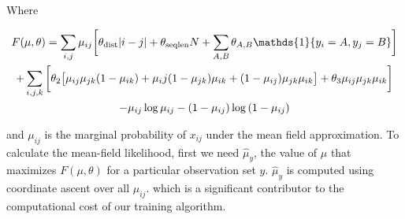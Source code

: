 \documentclass{article}
\begin{document}
Where 

\begin{multline} \label{eq:f}
F(\mu, \theta) = \sum_{i, j}\mu_{ij}\bigg[\theta_{\textmd{dist}}|i - j|+ \theta_{\textmd{seqlen}}N + \sum_{A, B} \theta_{A, B}\mathds{1}\{y_i = A, y_j = B\}\bigg] \\
+ \sum_{i, j, k} \bigg[\theta_2 \big[\mu_{ij}\mu_{jk}(1-\mu_{ik}) + \mu_ij(1-\mu_{jk})\mu_{ik} + (1 - \mu_{ij})\mu_{jk}\mu_{ik} \big] + \theta_3 \mu_{ij}\mu_{jk}\mu_{ik} \bigg] \\
- \mu_{ij} \log{\mu_{ij}} - (1 - \mu_{ij})\log{(1 - \mu_{ij})}
\end{multline}

and $\mu_{ij}$ is the marginal probability of $x_{ij}$ under the mean field approximation. To calculate the mean-field likelihood, first we need $\hat{\mu}_{y}$, the value of $\mu$ that maximizes $F(\mu, \theta)$ for a particular observation set $y$. $\hat{\mu}_{y}$ is computed using coordinate ascent over all $\mu_{ij}$. which is a significant contributor to the computational cost of our training algorithm.
\end{document}
